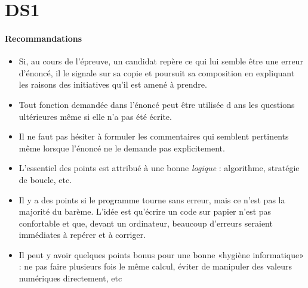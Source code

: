 \chapter{DS1}
\thispagestyle{empty}
\subsubsection{Recommandations}
\begin{itemize}
\item Si, au cours de l’épreuve, un candidat repère ce qui lui semble être une erreur d’énoncé, il le signale sur sa copie et poursuit sa composition en expliquant les raisons des initiatives qu’il est amené à prendre.
\item Tout fonction demandée dans l’énoncé peut être utilisée d ans les questions ultérieures même si elle n’a pas été écrite.
\item Il ne faut pas hésiter à formuler les commentaires qui semblent pertinents même
lorsque l’énoncé ne le demande pas explicitement.
\item L'essentiel des points est attribué à une bonne \emph{logique} : algorithme, stratégie de boucle, etc.
\item Il y a des points si le programme tourne sans erreur, mais ce n'est pas la majorité du barème. L'idée est qu'écrire un code sur papier n'est pas confortable et que, devant un ordinateur, beaucoup d'erreurs seraient immédiates à repérer et à corriger.
\item Il peut y avoir quelques points bonus pour une bonne «hygiène informatique» : ne pas faire plusieurs fois le même calcul, éviter de manipuler des valeurs numériques directement, etc
\end{itemize}
